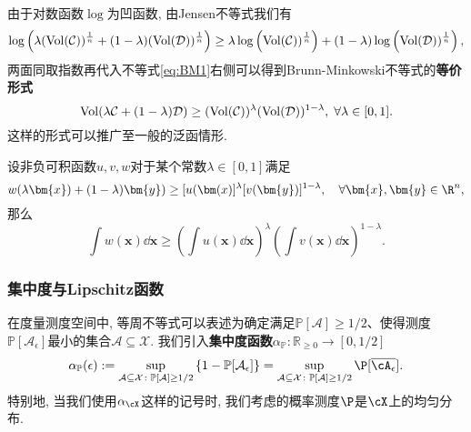 由于对数函数$\log$为凹函数, 由Jensen不等式我们有
\begin{equation*}
	\log \left( \lambda (\operatorname{Vol}(\mathcal{C}))^{\frac1n} + (1-\lambda) (\operatorname{Vol}(\mathcal{D}))^{\frac1n} \right)
	\geq \lambda \log \left( \operatorname{Vol}(\mathcal{C}))^{\frac1n} \right) + (1-\lambda) \log \left( \operatorname{Vol}(\mathcal{D}))^{\frac1n} \right), 
\end{equation*}
两面同取指数再代入不等式\eqref{eq:BM1}右侧可以得到Brunn-Minkowski不等式的\textbf{等价形式}
\begin{equation}\label{eq:BM2}
	\operatorname{Vol}(\lambda \mathcal{C} + (1-\lambda) \mathcal{D})  
	\geq (\operatorname{Vol}(\mathcal{C}))^{\lambda} (\operatorname{Vol}(\mathcal{D}))^{1-\lambda},\;
	\forall \lambda \in [0,1].
\end{equation}
这样的形式可以推广至一般的泛函情形.
\begin{theorem}\label{thm:Prékopa-LeindlerIneq}
	设非负可积函数$u,v,w$对于某个常数$\lambda \in [0,1]$满足
	\begin{equation}\label{eq:Prékopa-LeindlerCondition}
		w(\lambda \bm{x}) + (1-\lambda) \bm{y})
		\geq [u(\bm(x)]^{\lambda} [v(\bm{y})]^{1-\lambda},
		\quad \forall \bm{x}, \bm{y} \in \R^n, 
	\end{equation}
	那么
	\begin{equation}\label{eq:Prékopa-Leindler}
		\int w(\bm{x}) \dd \bm{x}
		\geq \left( \int u(\bm{x}) \dd \bm{x} \right)^{\lambda} \left( \int v(\bm{x}) \dd \bm{x} \right)^{1-\lambda}. 
	\end{equation}
\end{theorem}


\subsubsection{集中度与Lipschitz函数}

在度量测度空间中, 等周不等式可以表述为确定满足$\mathbb{P}[\mathcal{A}] \geq 1/2$、使得测度$\mathbb{P}[\mathcal{A}_{\epsilon}]$最小的集合$\mathcal{A} \subseteq \mathcal{X}$.
我们引入\textbf{集中度函数}$\alpha_{\mathbb{P}} \colon \mathbb{R}_{\geq 0} \to [0, 1/2]$
\begin{equation*}
	\alpha_{\mathbb{P}}(\epsilon)
	:= \sup_{\mathcal{A} \subseteq \mathcal{X} \colon \mathbb{P}[\mathcal{A}] \geq 1/2} \left\{ 1 - \mathbb{P}[\mathcal{A}_{\epsilon}] \right\}
	= \sup_{\mathcal{A} \subseteq \mathcal{X} \colon \mathbb{P}[\mathcal{A}] \geq 1/2} \P[ \overline{\cA_{\epsilon}} ]. 
\end{equation*}
特别地, 当我们使用$\alpha_{\cX}$这样的记号时, 我们考虑的概率测度$\P$是$\cX$上的均匀分布. 

